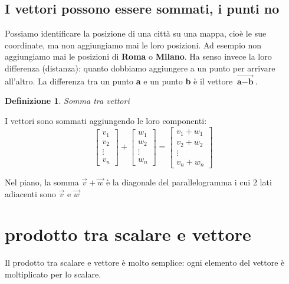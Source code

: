 \documentclass{report}
\newtheorem{definizione}{\textbf{Definizione}}[section]
\begin{document}
  \subsection{I vettori possono essere sommati, i punti no}
  Possiamo identificare la posizione di una città su una mappa, cioè le sue coordinate, ma non aggiungiamo mai le loro posizioni. Ad esempio non aggiungiamo mai le posizioni di \textbf{Roma} o \textbf{Milano}. Ha senso invece la loro differenza (distanza): quanto dobbiamo aggiungere a un punto per arrivare all'altro. La differenza tra un punto \textbf{a} e un punto \textbf{b} è il vettore  \(\vec{\textbf{a}-\textbf{b}}\).

  \begin{definizione}
    Somma tra vettori
  \end{definizione}
  I vettori sono sommati aggiungendo le loro componenti:
  \begin{equation}
    \begin{bmatrix}
      v_1\\
      v_2\\
      \vdots\\
      v_n
    \end{bmatrix} +
    \begin{bmatrix}
      w_1\\
      w_2\\
      \vdots\\
      w_n

    \end{bmatrix} = \begin{bmatrix}
      v_1+w_1\\
      v_2+w_2\\
      \vdots\\
      v_n+w_n
    \end{bmatrix}
    \end{equation}

    Nel piano, la somma \(\vec{v}+\vec{w}\) è la diagonale del parallelogramma i cui 2 lati adiacenti sono \(\vec{v}\) e \(\vec{w}\)

    \section{prodotto tra scalare e vettore}
    Il prodotto tra scalare e vettore è molto semplice: ogni elemento del vettore è moltiplicato per lo scalare.
\end{document}

